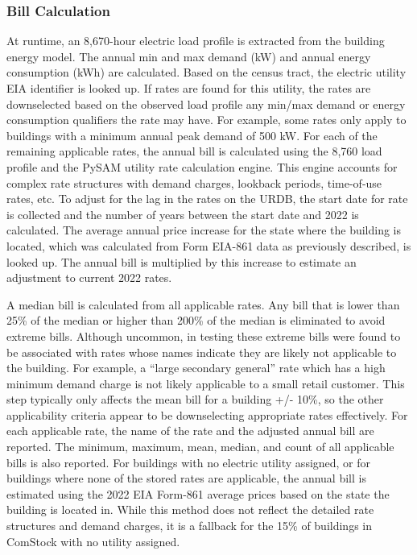 \subsubsection{Bill Calculation}
At runtime, an 8,670-hour electric load profile is extracted from the building energy model. The annual min and max demand (kW) and annual energy consumption (kWh) are calculated. Based on the census tract, the electric utility EIA identifier is looked up. If rates are found for this utility, the rates are downselected based on the observed load profile any min/max demand or energy consumption qualifiers the rate may have. For example, some rates only apply to buildings with a minimum annual peak demand of 500 kW.
For each of the remaining applicable rates, the annual bill is calculated using the 8,760 load profile and the PySAM utility rate calculation engine. This engine accounts for complex rate structures with demand charges, lookback periods, time-of-use rates, etc. To adjust for the lag in the rates on the URDB, the start date for rate is collected and the number of years between the start date and 2022 is calculated. The average annual price increase for the state where the building is located, which was calculated from Form EIA-861 data as previously described, is looked up. The annual bill is multiplied by this increase to estimate an adjustment to current 2022 rates.

A median bill is calculated from all applicable rates. Any bill that is lower than 25\% of the median or higher than 200\% of the median is eliminated to avoid extreme bills. Although uncommon, in testing these extreme bills were found to be associated with rates whose names indicate they are likely not applicable to the building. For example, a ``large secondary general'' rate which has a high minimum demand charge is not likely applicable to a small retail customer. This step typically only affects the mean bill for a building +/- 10\%, so the other applicability criteria appear to be downselecting appropriate rates effectively. For each applicable rate, the name of the rate and the adjusted annual bill are reported. The minimum, maximum, mean, median, and count of all applicable bills is also reported.
For buildings with no electric utility assigned, or for buildings where none of the stored rates are applicable, the annual bill is estimated using the 2022 EIA Form-861 \citep{eia_electricity} average prices based on the state the building is located in. While this method does not reflect the detailed rate structures and demand charges, it is a fallback for the 15\% of buildings in ComStock with no utility assigned.

